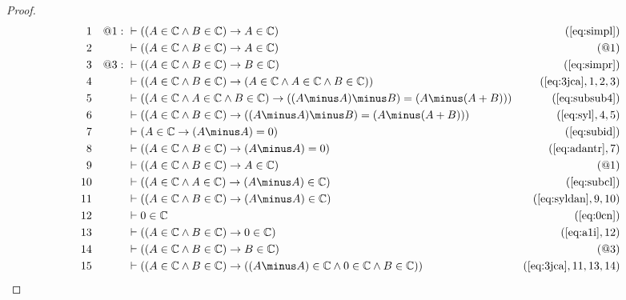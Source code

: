 \begin{proof}
\begin{align}
  1 && @1:\  & \vdash ( ( A \in \mathbb{C} \wedge B \in \mathbb{C} ) \rightarrow A \in \mathbb{C} )&(\mbox{\ref{eq:simpl}})\notag
  \\ 2 &&  & \vdash ( ( A \in \mathbb{C} \wedge B \in \mathbb{C} ) \rightarrow A \in \mathbb{C} )&(@1)\notag
  \\ 3 && @3:\  & \vdash ( ( A \in \mathbb{C} \wedge B \in \mathbb{C} ) \rightarrow B \in \mathbb{C} )&(\mbox{\ref{eq:simpr}})\notag
  \\ 4 &&  & \vdash ( ( A \in \mathbb{C} \wedge B \in \mathbb{C} ) \rightarrow ( A \in \mathbb{C} \wedge A \in \mathbb{C} \wedge B \in \mathbb{C} ) )&(\mbox{\ref{eq:3jca}},1,2,3)\notag
  \\ 5 &&  & \vdash ( ( A \in \mathbb{C} \wedge A \in \mathbb{C} \wedge B \in \mathbb{C} ) \rightarrow ( ( A \minus A ) \minus B ) = ( A \minus ( A + B ) ) )&(\mbox{\ref{eq:subsub4}})\notag
  \\ 6 &&  & \vdash ( ( A \in \mathbb{C} \wedge B \in \mathbb{C} ) \rightarrow ( ( A \minus A ) \minus B ) = ( A \minus ( A + B ) ) )&(\mbox{\ref{eq:syl}},4,5)\notag
  \\ 7 &&  & \vdash ( A \in \mathbb{C} \rightarrow ( A \minus A ) = 0 )&(\mbox{\ref{eq:subid}})\notag
  \\ 8 &&  & \vdash ( ( A \in \mathbb{C} \wedge B \in \mathbb{C} ) \rightarrow ( A \minus A ) = 0 )&(\mbox{\ref{eq:adantr}},7)\notag
  \\ 9 &&  & \vdash ( ( A \in \mathbb{C} \wedge B \in \mathbb{C} ) \rightarrow A \in \mathbb{C} )&(@1)\notag
  \\ 10 &&  & \vdash ( ( A \in \mathbb{C} \wedge A \in \mathbb{C} ) \rightarrow ( A \minus A ) \in \mathbb{C} )&(\mbox{\ref{eq:subcl}})\notag
  \\ 11 &&  & \vdash ( ( A \in \mathbb{C} \wedge B \in \mathbb{C} ) \rightarrow ( A \minus A ) \in \mathbb{C} )&(\mbox{\ref{eq:syldan}},9,10)\notag
  \\ 12 &&  & \vdash 0 \in \mathbb{C}&(\mbox{\ref{eq:0cn}})\notag
  \\ 13 &&  & \vdash ( ( A \in \mathbb{C} \wedge B \in \mathbb{C} ) \rightarrow 0 \in \mathbb{C} )&(\mbox{\ref{eq:a1i}},12)\notag
  \\ 14 &&  & \vdash ( ( A \in \mathbb{C} \wedge B \in \mathbb{C} ) \rightarrow B \in \mathbb{C} )&(@3)\notag
  \\ 15 &&  & \vdash ( ( A \in \mathbb{C} \wedge B \in \mathbb{C} ) \rightarrow ( ( A \minus A ) \in \mathbb{C} \wedge 0 \in \mathbb{C} \wedge B \in \mathbb{C} ) )&(\mbox{\ref{eq:3jca}},11,13,14)\notag

\end{align}
\end{proof}

